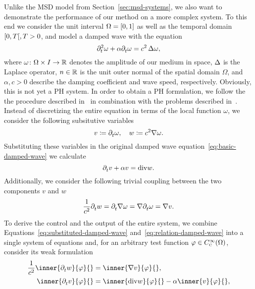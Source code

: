 Unlike the \ac{MSD} model from Section~\ref{sec:msd-systems}, we also want to demonstrate the performance of our method on a more complex system.
To this end we consider the unit interval $\Omega = \interval{0}{1}$ as well as the temporal domain $\interval[open right]{0}{T}, T > 0$, and model a damped wave with the equation
\begin{equation}\label{eq:basic-damped-wave}
    \pd[t]{2} \omega + \alpha \pd[t]{} \omega = c^2 \lapl[\omega],
\end{equation}
where $\omega \colon \Omega \times I \to \bb{R}$ denotes the amplitude of our medium in space, $\lapl$ is the Laplace operator, $n \in \bb{R}$ is the unit outer normal of the spatial domain $\Omega$, and $\alpha, c > 0$ describe the damping coefficient and wave speed, respectively.
Obviously, this is not yet a \ac{PH} system.
In order to obtain a \ac{PH} formulation, we follow the the procedure described in~\cite{Serhani2019_2, HMS2022} in combination with the problems described in~\cite{Brugnoli2021, Poussot2023}.
Instead of discretizing the entire equation in terms of the local function $\omega$, we consider the following subsitutive variables
\begin{equation*}
    v \coloneqq \pd[t]{} \omega,\quad w \coloneqq c^2 \nabla \omega.
\end{equation*}
Substituting these variables in the original damped wave equation~\eqref{eq:basic-damped-wave} we calculate
\begin{equation}\label{eq:substituted-damped-wave}
    \pd[t]{} v + \alpha v = \dvg{w}.
\end{equation}
Additionally, we consider the following trivial coupling between the two components $v$ and $w$
\begin{equation}\label{eq:relation-damped-wave}
    \frac{1}{c^2} \pd[t]{} w = \pd[t]{} \nabla \omega = \nabla \pd[t]{} \omega = \nabla v.
\end{equation}
To derive the control and the output of the entire system, we combine Equations~\eqref{eq:substituted-damped-wave} and~\eqref{eq:relation-damped-wave} into a single system of equations and, for an arbitrary test function $\varphi \in C_\msc{c}^\infty(\Omega)$, consider its weak formulation
\begin{equation*}
    \begin{aligned}
        \frac{1}{c^2} \inner{\pd[t]{} w}{\varphi}{} &= \inner{\nabla v}{\varphi}{}, \\
        \inner{\pd[t]{} v}{\varphi}{} &= \inner{\dvg{w}}{\varphi}{} - \alpha \inner{v}{\varphi}{},
    \end{aligned}
\end{equation*}
